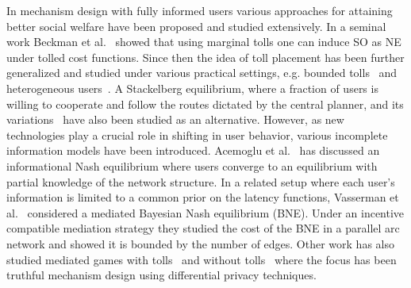 In mechanism design with fully informed users various approaches for attaining better social welfare have been proposed and studied extensively. In a seminal work Beckman et al.~\cite{beckmann1956studies} showed that using marginal tolls one can induce SO as NE under tolled cost functions. Since then the idea of toll placement has been further generalized and studied under various practical settings, e.g. bounded tolls~\cite{hoefer2008taxing, bonifaci2011efficiency, jelinek2014computing} and heterogeneous users~\cite{cole2003pricing, fleischer2004tolls}. A Stackelberg equilibrium, where a fraction of users is willing to cooperate and follow the routes dictated by the central planner, and its variations~\cite{karakostas2009stackelberg, swamy2012effectiveness} have also been studied as an alternative. However, as new technologies play a crucial role in shifting in user behavior, various incomplete information models have been introduced.  Acemoglu et al.~\cite{acemoglu2016informational} has discussed an informational Nash equilibrium where users converge to an equilibrium with partial knowledge of the network structure. In a related setup where each user's information is limited to a common prior on the latency functions, Vasserman et al.~\cite{vasserman2015implementing} considered a mediated Bayesian Nash equilibrium (BNE). Under an incentive compatible mediation strategy they studied the cost of the BNE in a parallel arc network and showed it is bounded by the number of edges. Other work has also studied mediated games with tolls~\cite{rogers2015inducing} and without tolls~\cite{kearns2014mechanism} where the focus has been truthful mechanism design using differential privacy techniques.  
 

